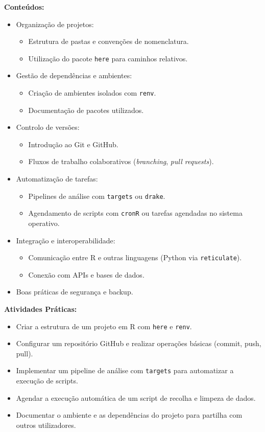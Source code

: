 \documentclass[12pt]{article}
\begin{document}
\textbf{Conteúdos:}
\begin{itemize}
  \item Organização de projetos:
    \begin{itemize}
      \item Estrutura de pastas e convenções de nomenclatura.
      \item Utilização do pacote \texttt{here} para caminhos relativos.
    \end{itemize}
  \item Gestão de dependências e ambientes:
    \begin{itemize}
      \item Criação de ambientes isolados com \texttt{renv}.
      \item Documentação de pacotes utilizados.
    \end{itemize}
  \item Controlo de versões:
    \begin{itemize}
      \item Introdução ao Git e GitHub.
      \item Fluxos de trabalho colaborativos (\textit{branching}, \textit{pull requests}).
    \end{itemize}
  \item Automatização de tarefas:
    \begin{itemize}
      \item Pipelines de análise com \texttt{targets} ou \texttt{drake}.
      \item Agendamento de scripts com \texttt{cronR} ou tarefas agendadas no sistema operativo.
    \end{itemize}
  \item Integração e interoperabilidade:
    \begin{itemize}
      \item Comunicação entre R e outras linguagens (Python via \texttt{reticulate}).
      \item Conexão com APIs e bases de dados.
    \end{itemize}
  \item Boas práticas de segurança e backup.
\end{itemize}

\textbf{Atividades Práticas:}
\begin{itemize}
  \item Criar a estrutura de um projeto em R com \texttt{here} e \texttt{renv}.
  \item Configurar um repositório GitHub e realizar operações básicas (commit, push, pull).
  \item Implementar um pipeline de análise com \texttt{targets} para automatizar a execução de scripts.
  \item Agendar a execução automática de um script de recolha e limpeza de dados.
  \item Documentar o ambiente e as dependências do projeto para partilha com outros utilizadores.
\end{itemize}
\end{document}
